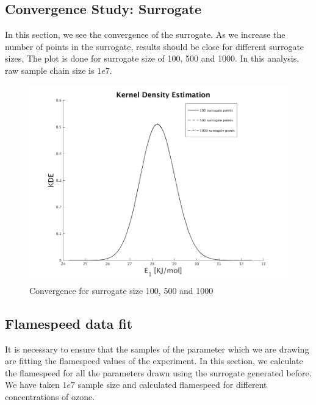 \subsection{Convergence Study: Surrogate }

 In this section, we see the convergence of the surrogate. As we increase the number of points in the surrogate, results should be close for different surrogate sizes. The plot is done for surrogate size of 100, 500 and 1000. In this analysis, raw sample chain size is $1e7$.

\begin{figure}[H]
\includegraphics[scale=0.5]{model_1/conv_surrogate}
    \caption{Convergence for surrogate size 100, 500 and 1000}
\end{figure}


\subsection{Flamespeed data fit}

 It is necessary to ensure that the samples of the parameter which we are drawing are fitting the flamespeed values of the experiment. In this section, we calculate the flamespeed for all the parameters drawn using the surrogate generated before. We have taken $1e7$ sample size and calculated flamespeed for different concentrations of ozone.

